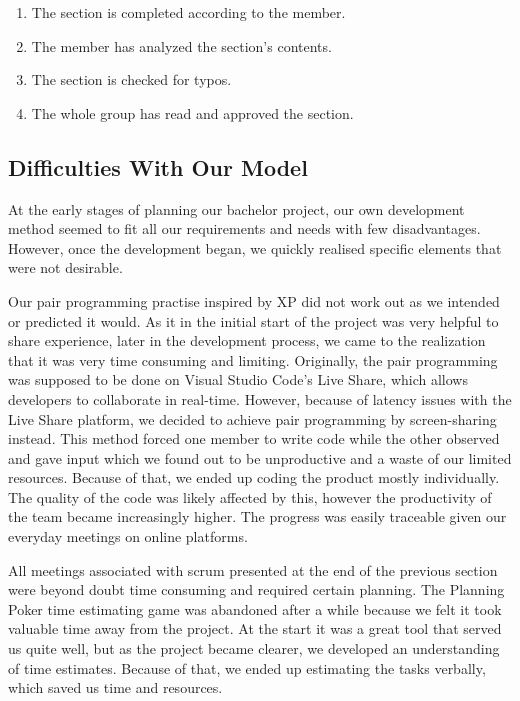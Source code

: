 \begin{enumerate}
    \item The section is completed according to the member.
    \item The member has analyzed the section's contents.
    \item The section is checked for typos.
    \item The whole group has read and approved the section.
\end{enumerate}

\subsection{Difficulties With Our Model}
At the early stages of planning our bachelor project, our own development method seemed to fit all our requirements and needs with few disadvantages. However, once the development began, we quickly realised specific elements that were not desirable. 

Our pair programming practise inspired by XP did not work out as we intended or predicted it would. As it in the initial start of the project was very helpful to share experience, later in the development process, we came to the realization that it was very time consuming and limiting. Originally, the pair programming was supposed to be done on Visual Studio Code's Live Share, which allows developers to collaborate in real-time. However, because of latency issues with the Live Share platform, we decided to achieve pair programming by screen-sharing instead. This method forced one member to write code while the other observed and gave input which we found out to be unproductive and a waste of our limited resources. Because of that, we ended up coding the product mostly individually. The quality of the code was likely affected by this, however the productivity of the team became increasingly higher. The progress was easily traceable given our everyday meetings on online platforms.   

All meetings associated with scrum presented at the end of the previous section were beyond doubt time consuming and required certain planning. The Planning Poker time estimating game was abandoned after a while because we felt it took valuable time away from the project. At the start it was a great tool that served us quite well, but as the project became clearer, we developed an understanding of time estimates. Because of that, we ended up estimating the tasks verbally, which saved us time and resources.  

